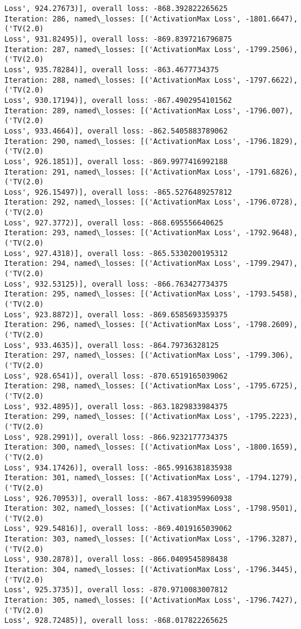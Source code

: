 \documentclass[10pt]{article}
\begin{document}
\begin{Verbatim}[commandchars=\\\{\}]
Loss', 924.27673)], overall loss: -868.392822265625
Iteration: 286, named\_losses: [('ActivationMax Loss', -1801.6647), ('TV(2.0)
Loss', 931.82495)], overall loss: -869.8397216796875
Iteration: 287, named\_losses: [('ActivationMax Loss', -1799.2506), ('TV(2.0)
Loss', 935.78284)], overall loss: -863.4677734375
Iteration: 288, named\_losses: [('ActivationMax Loss', -1797.6622), ('TV(2.0)
Loss', 930.17194)], overall loss: -867.4902954101562
Iteration: 289, named\_losses: [('ActivationMax Loss', -1796.007), ('TV(2.0)
Loss', 933.4664)], overall loss: -862.5405883789062
Iteration: 290, named\_losses: [('ActivationMax Loss', -1796.1829), ('TV(2.0)
Loss', 926.1851)], overall loss: -869.9977416992188
Iteration: 291, named\_losses: [('ActivationMax Loss', -1791.6826), ('TV(2.0)
Loss', 926.15497)], overall loss: -865.5276489257812
Iteration: 292, named\_losses: [('ActivationMax Loss', -1796.0728), ('TV(2.0)
Loss', 927.3772)], overall loss: -868.695556640625
Iteration: 293, named\_losses: [('ActivationMax Loss', -1792.9648), ('TV(2.0)
Loss', 927.4318)], overall loss: -865.5330200195312
Iteration: 294, named\_losses: [('ActivationMax Loss', -1799.2947), ('TV(2.0)
Loss', 932.53125)], overall loss: -866.763427734375
Iteration: 295, named\_losses: [('ActivationMax Loss', -1793.5458), ('TV(2.0)
Loss', 923.8872)], overall loss: -869.6585693359375
Iteration: 296, named\_losses: [('ActivationMax Loss', -1798.2609), ('TV(2.0)
Loss', 933.4635)], overall loss: -864.79736328125
Iteration: 297, named\_losses: [('ActivationMax Loss', -1799.306), ('TV(2.0)
Loss', 928.6541)], overall loss: -870.6519165039062
Iteration: 298, named\_losses: [('ActivationMax Loss', -1795.6725), ('TV(2.0)
Loss', 932.4895)], overall loss: -863.1829833984375
Iteration: 299, named\_losses: [('ActivationMax Loss', -1795.2223), ('TV(2.0)
Loss', 928.2991)], overall loss: -866.9232177734375
Iteration: 300, named\_losses: [('ActivationMax Loss', -1800.1659), ('TV(2.0)
Loss', 934.17426)], overall loss: -865.9916381835938
Iteration: 301, named\_losses: [('ActivationMax Loss', -1794.1279), ('TV(2.0)
Loss', 926.70953)], overall loss: -867.4183959960938
Iteration: 302, named\_losses: [('ActivationMax Loss', -1798.9501), ('TV(2.0)
Loss', 929.54816)], overall loss: -869.4019165039062
Iteration: 303, named\_losses: [('ActivationMax Loss', -1796.3287), ('TV(2.0)
Loss', 930.2878)], overall loss: -866.0409545898438
Iteration: 304, named\_losses: [('ActivationMax Loss', -1796.3445), ('TV(2.0)
Loss', 925.3735)], overall loss: -870.9710083007812
Iteration: 305, named\_losses: [('ActivationMax Loss', -1796.7427), ('TV(2.0)
Loss', 928.72485)], overall loss: -868.017822265625

\end{Verbatim}
\end{document}
